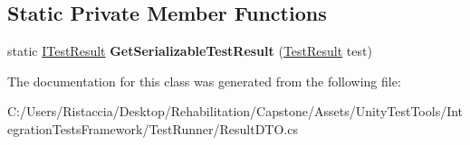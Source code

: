 \subsection*{Static Private Member Functions}
\begin{DoxyCompactItemize}
\item 
\mbox{\label{class_unity_test_1_1_result_d_t_o_aa51b755e31f0844c7a58468a92bf6cc7}} 
static \hyperlink{interface_i_test_result}{I\+Test\+Result} {\bfseries Get\+Serializable\+Test\+Result} (\hyperlink{class_unity_test_1_1_test_result}{Test\+Result} test)
\end{DoxyCompactItemize}


The documentation for this class was generated from the following file\+:\begin{DoxyCompactItemize}
\item 
C\+:/\+Users/\+Ristaccia/\+Desktop/\+Rehabilitation/\+Capstone/\+Assets/\+Unity\+Test\+Tools/\+Integration\+Tests\+Framework/\+Test\+Runner/Result\+D\+T\+O.\+cs\end{DoxyCompactItemize}
